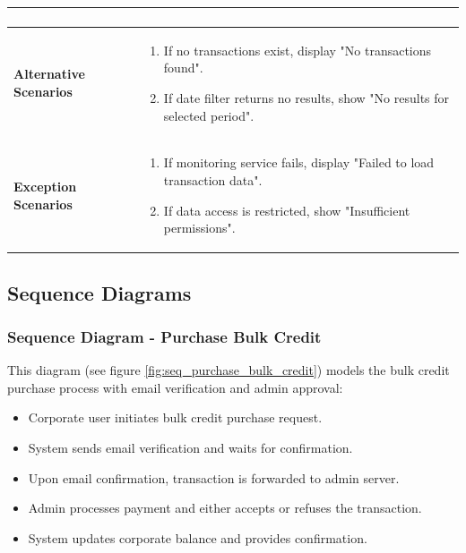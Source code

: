 \begin{longtable}{|p{}|p{}|}
\begin{enumerate}[nosep,leftmargin=*]
    \end{enumerate} \\ \hline
  \textbf{Alternative Scenarios} &
    \begin{enumerate}[nosep,leftmargin=*]
      \item If no transactions exist, display "No transactions found".
      \item If date filter returns no results, show "No results for selected period".
    \end{enumerate} \\ \hline
  \textbf{Exception Scenarios} &
    \begin{enumerate}[nosep,leftmargin=*]
      \item If monitoring service fails, display "Failed to load transaction data".
      \item If data access is restricted, show "Insufficient permissions".
    \end{enumerate} \\ \hline

\end{longtable}

\vspace{5cm}

\subsection{Sequence Diagrams}

\subsubsection{Sequence Diagram - Purchase Bulk Credit}
This diagram (see figure \ref{fig:seq_purchase_bulk_credit}) models the bulk credit purchase process with email verification and admin approval:
\begin{itemize}[nosep,leftmargin=*]
  \item Corporate user initiates bulk credit purchase request.
  \item System sends email verification and waits for confirmation.
  \item Upon email confirmation, transaction is forwarded to admin server.
  \item Admin processes payment and either accepts or refuses the transaction.
  \item System updates corporate balance and provides confirmation.
\end{itemize}

